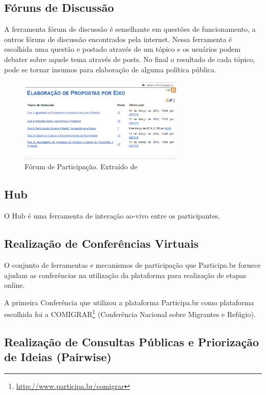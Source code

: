 \subsection*{Fóruns de Discussão}

A ferramenta fórum de discussão é semelhante em questões de funcionamento, a outros fóruns de discussão encontrados pela internet. Nessa ferramenta é escolhida uma questão e postado através de um tópico e os usuários podem debater sobre aquele tema através de posts. No final o resultado de cada tópico, pode se tornar insumos para elaboração de alguma política pública.

\graphicspath{{figuras/}}
\begin{figure}[H]
\centering
\includegraphics[width=0.7\textwidth]{foruns-participacao}
\caption{Fórum de Participação. Extraído de}
\label{fig:forumsparticipacao}
\end{figure}

\subsection*{Hub}

O Hub é uma ferramenta de interação ao-vivo entre os participantes. 

\subsection*{Realização de Conferências Virtuais}

O conjunto de ferramentas e mecanismos de participação que Participa.br fornece ajudam as conferências na utilização da plataforma para realização de etapas online.

A primeira Conferência que utilizou a plataforma Participa.br como plataforma escolhida foi a COMIGRAR\footnote{\url{http://www.participa.br/comigrar}} (Conferência Nacional sobre Migrantes e Refúgio).

\subsection*{Realização de Consultas Públicas e Priorização de Ideias (Pairwise)}


